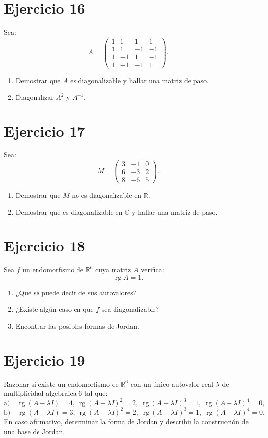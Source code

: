 \documentclass[11pt,a4paper]{article}
\newcommand{\R}{\mathbb{R}}
\newcommand{\C}{\mathbb{C}}
\newcommand{\rg}{\operatorname{rg}}
\begin{document}
\section{Ejercicio 16}
Sea:
\[
A=
\begin{pmatrix}
1&1&1&1\\
1&1&-1&-1\\
1&-1&1&-1\\
1&-1&-1&1
\end{pmatrix}.
\]
\begin{enumerate}[label=\alph*)]
\item Demostrar que $A$ es diagonalizable y hallar una matriz de paso.
\item Diagonalizar $A^2$ y $A^{-1}$.
\end{enumerate}

\section{Ejercicio 17}
Sea:
\[
M=
\begin{pmatrix}
3&-1&0\\
6&-3&2\\
8&-6&5
\end{pmatrix}.
\]
\begin{enumerate}[label=\alph*)]
\item Demostrar que $M$ no es diagonalizable en $\R$.
\item Demostrar que es diagonalizable en $\C$ y hallar una matriz de paso.
\end{enumerate}

\section{Ejercicio 18}
Sea $f$ un endomorfismo de $\R^6$ cuya matriz $A$ verifica:
\[
\rg A=1.
\]
\begin{enumerate}[label=\alph*)]
\item ¿Qué se puede decir de sus autovalores?
\item ¿Existe algún caso en que $f$ sea diagonalizable?
\item Encontrar las posibles formas de Jordan.
\end{enumerate}

\section{Ejercicio 19}
Razonar si existe un endomorfismo de $\R^6$ con un único autovalor real $\lambda$ de multiplicidad algebraica $6$ tal que:
\[
\text{a)}\quad
\rg(A-\lambda I)=4,\;
\rg(A-\lambda I)^2=2,\;
\rg(A-\lambda I)^3=1,\;
\rg(A-\lambda I)^4=0,
\]
\[
\text{b)}\quad
\rg(A-\lambda I)=3,\;
\rg(A-\lambda I)^2=2,\;
\rg(A-\lambda I)^3=1,\;
\rg(A-\lambda I)^4=0.
\]
En caso afirmativo, determinar la forma de Jordan y describir la construcción de una base de Jordan.
\end{document}
